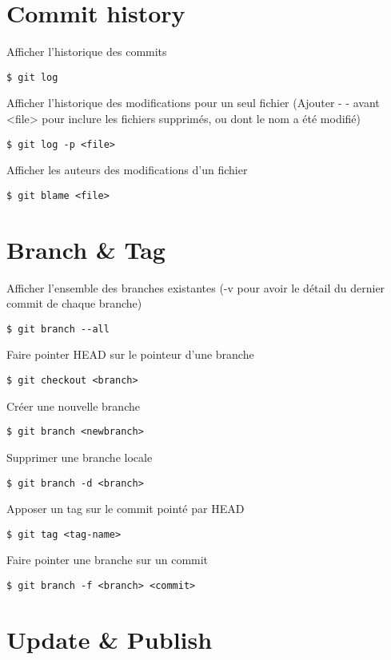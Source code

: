 \documentclass[jou,floatsintext]{apa6}
\begin{document}
\section{Commit history}

Afficher l'historique des commits
\begin{lstlisting}
$ git log
\end{lstlisting}
Afficher l'historique des modifications pour un seul fichier (Ajouter - - avant <file> pour inclure les fichiers supprimés, ou dont le nom a été modifié)
\begin{lstlisting}
$ git log -p <file>
\end{lstlisting}
Afficher les auteurs des modifications d'un fichier
\begin{lstlisting}
$ git blame <file>
\end{lstlisting}

\section{Branch \& Tag}

Afficher l'ensemble des branches existantes (-v pour avoir le détail du dernier commit de chaque branche)
\begin{lstlisting}
$ git branch --all 
\end{lstlisting}
Faire pointer HEAD sur le pointeur d'une branche
\begin{lstlisting}
$ git checkout <branch>
\end{lstlisting}
Créer une nouvelle branche
\begin{lstlisting}
$ git branch <newbranch>
\end{lstlisting}
Supprimer une branche locale
\begin{lstlisting}
$ git branch -d <branch>
\end{lstlisting}
Apposer un tag sur le commit pointé par HEAD
\begin{lstlisting}
$ git tag <tag-name>
\end{lstlisting}
Faire pointer une branche sur un commit
\begin{lstlisting}
$ git branch -f <branch> <commit>
\end{lstlisting}

\section{Update \& Publish}
\end{document}
